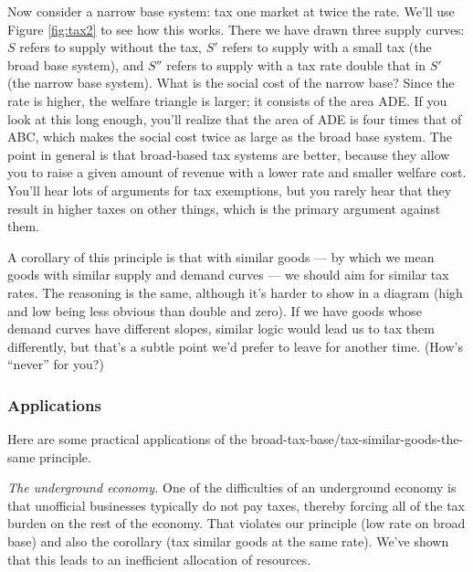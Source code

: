\documentclass[letterpaper,12pt]{article}
\begin{document}
Now consider a narrow base system:
tax one market at twice the rate.
We'll use Figure \ref{fig:tax2} to see how this works.
There we have drawn three supply curves:
$S$ refers to supply without the tax,
$S'$ refers to supply with a small tax (the broad base system),
and $S''$ refers to supply with a tax rate double that in $S'$
(the narrow base system).
What is the social cost of the narrow base?
Since the rate is higher,
the welfare triangle is larger;
it consists of the area ADE.
If you look at this long enough, you'll realize that
the area of ADE is four times that of ABC,
which makes the social cost twice as large
as the broad base system.
The point in general is that broad-based tax systems are better,
because they allow you to raise a given amount of revenue with
a lower rate and smaller welfare cost.
You'll hear lots of arguments for tax exemptions,
but you rarely hear that they result in higher taxes on other things,
which is the primary argument against them.


A corollary of this principle is that with similar goods ---
by which we mean goods with similar supply and demand curves ---
we should aim for similar tax rates.
The reasoning is the same,
although it's harder to show in a diagram
(high and low being less obvious than double and zero).
If we have goods whose demand curves have different slopes,
similar logic would lead us to tax them differently,
but that's a subtle point we'd prefer to leave for another time.
(How's ``never'' for you?)


\subsubsection*{Applications}

Here are some practical applications
of the broad-tax-base/tax-similar-goods-the-same principle.

{\it The underground economy.\/}
One of the difficulties of an underground economy is that
unofficial businesses typically do not pay taxes,
thereby forcing all of the tax burden on the rest
of the economy.
That violates our principle (low rate on broad base) and also
the corollary (tax similar goods at the same rate).
We've shown that this leads to an inefficient allocation of resources.
\end{document}
